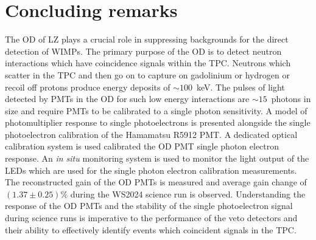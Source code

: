\pagebreak

\section{Concluding remarks}
The OD of LZ plays a crucial role in suppressing backgrounds for the direct detection of WIMPs. The primary purpose of the OD is to detect neutron interactions which have coincidence signals within the TPC. Neutrons which scatter in the TPC and then go on to capture on gadolinium or hydrogen or recoil off protons produce energy deposits of $\sim100$~keV. The pulses of light detected by PMTs in the OD for such low energy interactions are $\sim15$~photons in size and require PMTs to be calibrated to a single photon sensitivity. A model of photomultiplier response to single photoelectrons is presented alongside the single photoelectron calibration of the Hamamatsu R5912 PMT. A dedicated optical calibration system is used calibrated the OD PMT single photon electron response. An \textit{in situ} monitoring system is used to monitor the light output of the LEDs which are used for the single photon electron calibration measurements. The reconstructed gain of the OD PMTs is measured and average gain change of $(1.37\pm0.25)\%$ during the WS2024 science run is observed. Understanding the response of the OD PMTs and the stability of the single photoelectron signal during science runs is imperative to the performance of the veto detectors and their ability to effectively identify events which coincident signals in the TPC.